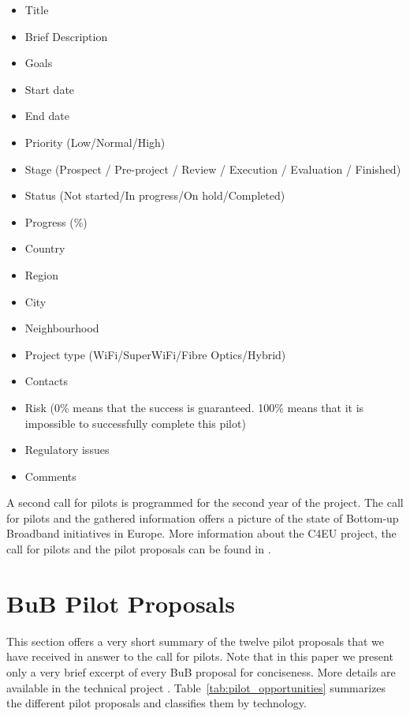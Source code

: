 \documentclass[conference]{IEEEtran}
\begin{document}
\begin{itemize}
  \item Title
  \item Brief Description
  \item Goals
  \item Start date
  \item End date
  \item Priority (Low/Normal/High)
  \item Stage 
  (Prospect / Pre-project / Review / Execution / Evaluation / Finished)
  \item Status (Not started/In progress/On hold/Completed)
  \item Progress (\%)
  \item Country
  \item Region
  \item City
  \item Neighbourhood
  \item Project type (WiFi/SuperWiFi/Fibre Optics/Hybrid)
  \item Contacts
  \item Risk (0\% means that the success is guaranteed. 100\% means that it is impossible to successfully complete this pilot)
  \item Regulatory issues
  \item Comments
\end{itemize}

A second call for pilots is programmed for the second year of the project. 
The call for pilots and the gathered information offers a picture of the state of Bottom-up Broadband initiatives in Europe.
More information about the C4EU project, the call for pilots and the pilot proposals can be found in \cite{barcelo2012bpp}.

\section{BuB Pilot Proposals}
\label{sec:proposals}

This section offers a very short summary of the twelve pilot proposals that we have received in answer to the call for pilots.
Note that in this paper we present only a very brief excerpt of every BuB proposal for conciseness. 
More details are available in the technical project \cite{barcelo2012bpp}.
Table~\ref{tab:pilot_opportunities} summarizes the different pilot proposals and classifies them by technology.
\end{document}
